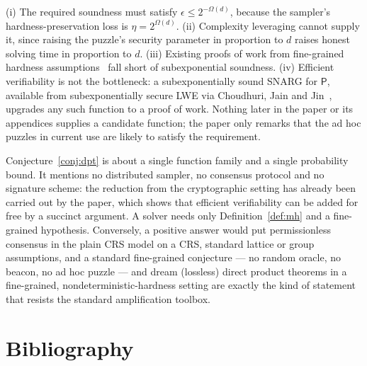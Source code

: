 \documentclass{aicr-conjecture}
\begin{document}
\begin{remark}
(i) The required soundness must satisfy $\epsilon \le 2^{-\Omega(d)}$, because the sampler's hardness-preservation loss is $\eta = 2^{\Omega(d)}$. (ii) Complexity leveraging cannot supply it, since raising the puzzle's security parameter in proportion to $d$ raises honest solving time in proportion to $d$. (iii) Existing proofs of work from fine-grained hardness assumptions~\cite{BGH24a} fall short of subexponential soundness. (iv) Efficient verifiability is not the bottleneck: a subexponentially sound SNARG for $\mathsf{P}$, available from subexponentially secure LWE via Choudhuri, Jain and Jin~\cite{CJJ21}, upgrades any such function to a proof of work. Nothing later in the paper or its appendices supplies a candidate function; the paper only remarks that the ad hoc puzzles in current use are likely to satisfy the requirement.
\end{remark}

\begin{remark}
Conjecture~\ref{conj:dpt} is about a single function family and a single probability bound. It mentions no distributed sampler, no consensus protocol and no signature scheme: the reduction from the cryptographic setting has already been carried out by the paper, which shows that efficient verifiability can be added for free by a succinct argument. A solver needs only Definition~\ref{def:mh} and a fine-grained hypothesis. Conversely, a positive answer would put permissionless consensus in the plain CRS model on a CRS, standard lattice or group assumptions, and a standard fine-grained conjecture --- no random oracle, no beacon, no ad hoc puzzle --- and dream (lossless) direct product theorems in a fine-grained, nondeterministic-hardness setting are exactly the kind of statement that resists the standard amplification toolbox.
\end{remark}

\section{Bibliography}
\end{document}
